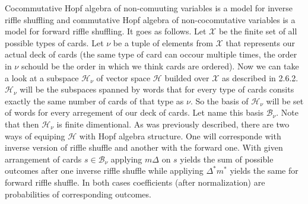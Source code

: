\documentclass[a4paper, 12pt]{report}
\begin{document}
Cocommutative Hopf algebra of non-comuuting variables is a model for inverse riffle shuffling and commutative 
Hopf algebra of non-cocomutative variables is a model for forward riffle shuffling. It goes as follows.
Let $\mathcal{X}$ be the finite set of all possible types of cards. Let $\nu$ be a tuple of 
elements from $\mathcal{X}$ that represents our actual deck of cards (the same type of card can occour
multiple times, the order in $\nu$ schould be the order in which we think cards are ordered). Now we can 
take a look at a subspace $\mathcal{H}_\nu$ of vector space $\mathcal{H}$ builded over $\mathcal{X}$ as 
described in 2.6.2. $\mathcal{H}_\nu$ will be the subspaces spanned by words that for every type of cards 
consits exactly the same number of cards of that type as $\nu$. So the basis of $\mathcal{H}_\nu$ will be set 
of words for every arregement of our deck of cards. Let name this basis $\mathcal{B}_\nu$. Note that then 
$\mathcal{H}_\nu$ is finite dimentional. As was previously described, there are two ways of equiping 
$\mathcal{H}$ with Hopf algebra structure. One will corresponde with inverse version of riffle shuffle and 
another with the forward one. With given arrangement of cards $s \in \mathcal{B}_\nu$ applying $m\Delta$ on 
$s$ yields the sum of possible outcomes after one inverse riffle shuffle while appliying $\Delta^*m^*$ 
yields the same for forward riffle shuffle. In both cases coefficients (after normalization) are 
probabilities of corresponding outcomes. 
\end{document}

